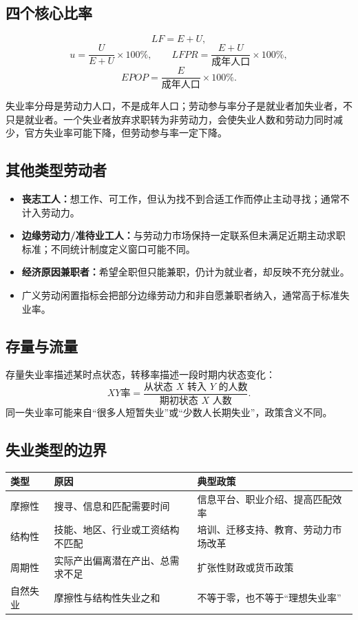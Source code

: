 \documentclass[UTF8,11pt,a4paper]{ctexart}
\newcommand{\term}[1]{\textbf{#1}}
\begin{document}
\subsection{四个核心比率}
\[
LF=E+U,
\]
\[
u=\frac{U}{E+U}\times100\%,
\qquad
LFPR=\frac{E+U}{\text{成年人口}}\times100\%,
\]
\[
EPOP=\frac{E}{\text{成年人口}}\times100\%.
\]
\begin{warningbox}[分母陷阱]
失业率分母是劳动力人口，不是成年人口；劳动参与率分子是就业者加失业者，不只是就业者。一个失业者放弃求职转为非劳动力，会使失业人数和劳动力同时减少，官方失业率可能下降，但劳动参与率一定下降。
\end{warningbox}

\subsection{其他类型劳动者}
\begin{itemize}
  \item \term{丧志工人：}想工作、可工作，但认为找不到合适工作而停止主动寻找；通常不计入劳动力。
  \item \term{边缘劳动力/准待业工人：}与劳动力市场保持一定联系但未满足近期主动求职标准；不同统计制度定义窗口可能不同。
  \item \term{经济原因兼职者：}希望全职但只能兼职，仍计为就业者，却反映不充分就业。
  \item 广义劳动闲置指标会把部分边缘劳动力和非自愿兼职者纳入，通常高于标准失业率。
\end{itemize}

\subsection{存量与流量}
存量失业率描述某时点状态，转移率描述一段时期内状态变化：
\[
XY\text{率}=\frac{\text{从状态 }X\text{ 转入 }Y\text{ 的人数}}{\text{期初状态 }X\text{ 人数}}.
\]
同一失业率可能来自“很多人短暂失业”或“少数人长期失业”，政策含义不同。

\subsection{失业类型的边界}
\begin{longtable}{p{}p{}p{}}
\toprule
类型 & 原因 & 典型政策\\
\midrule
摩擦性 & 搜寻、信息和匹配需要时间 & 信息平台、职业介绍、提高匹配效率\\
结构性 & 技能、地区、行业或工资结构不匹配 & 培训、迁移支持、教育、劳动力市场改革\\
周期性 & 实际产出偏离潜在产出、总需求不足 & 扩张性财政或货币政策\\
自然失业 & 摩擦性与结构性失业之和 & 不等于零，也不等于“理想失业率”\\
\bottomrule
\end{longtable}
\end{document}

